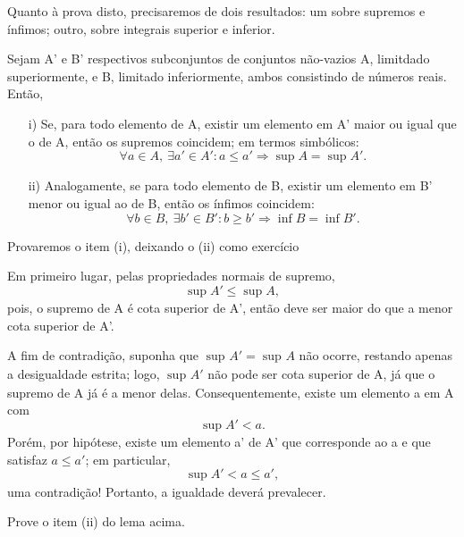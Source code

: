 \documentclass[../analysisII_notes.tex]{subfiles}
\begin{document}
Quanto à prova disto, precisaremos de dois resultados: um sobre supremos e ínfimos; outro, sobre integrais superior e inferior.
\begin{lemma*}
	Sejam A' e B' respectivos subconjuntos de conjuntos não-vazios A, limitdado superiormente, e B, limitado inferiormente, ambos consistindo de números reais. Então,
	\begin{itemize}
		\item[i)] Se, para todo elemento de A, existir um elemento em A' maior ou igual que o de A, então os supremos coincidem; em termos simbólicos:
		      \[
			      \forall a\in A,\: \exists a'\in A': a\leq a' \Rightarrow \sup_{}A = \sup_{}A'.
		      \]
		\item[ii)] Analogamente, se para todo elemento de B, existir um elemento em B' menor ou igual ao de B, então os ínfimos coincidem:
		      \[
			      \forall b\in B,\: \exists b'\in B': b\geq b' \Rightarrow \inf_{}B = \inf_{}B'.
		      \]
	\end{itemize}
\end{lemma*}
\begin{proof*}
	Provaremos o item (i), deixando o (ii) como exercício

	Em primeiro lugar, pelas propriedades normais de supremo,
	\[
		\sup_{}A' \leq \sup_{}A,
	\]
	pois, o supremo de A é cota superior de A', então deve ser maior do que a menor cota superior de A'.

	A fim de contradição, suponha que \(\sup_{}A'=\sup_{}A\) não ocorre, restando apenas a desigualdade estrita; logo, \(\sup_{}A'\) não pode ser cota superior de A, já que o supremo de A já é a menor delas. Consequentemente, existe um elemento a em A com
	\[
		\sup_{}A' < a.
	\]
	Porém, por hipótese, existe um elemento a' de A' que corresponde ao a e que satisfaz \(a\leq a'\); em particular,
	\[
		\sup_{}A' < a \leq a',
	\]
	uma contradição! Portanto, a igualdade deverá prevalecer. \qedsymbol
\end{proof*}
\begin{exr}
	Prove o item (ii) do lema acima.
\end{exr}
\end{document}
